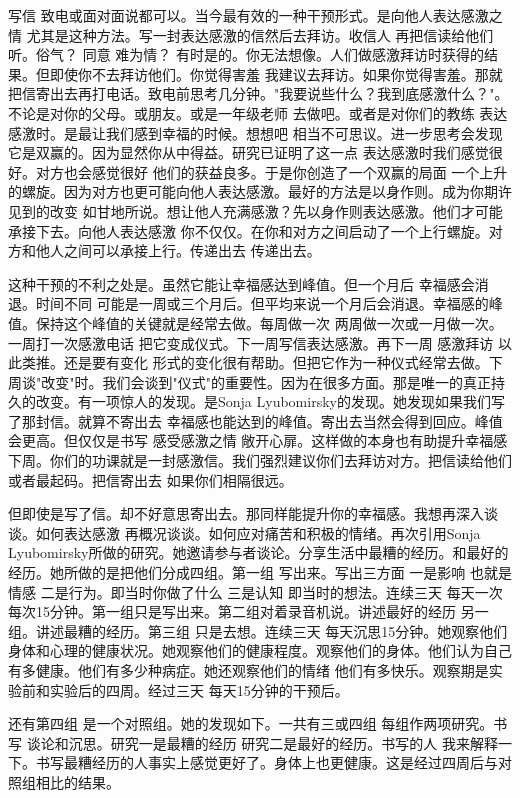 写信 致电或面对面说都可以。当今最有效的一种干预形式。是向他人表达感激之情 尤其是这种方法。写一封表达感激的信然后去拜访。收信人 再把信读给他们听。俗气？ 同意 难为情？ 有时是的。你无法想像。人们做感激拜访时获得的结果。但即使你不去拜访他们。你觉得害羞 我建议去拜访。如果你觉得害羞。那就把信寄出去再打电话。致电前思考几分钟。"我要说些什么？我到底感激什么？"。不论是对你的父母。或朋友。或是一年级老师 去做吧。或者是对你们的教练 表达感激时。是最让我们感到幸福的时候。想想吧 相当不可思议。进一步思考会发现它是双赢的。因为显然你从中得益。研究已证明了这一点 表达感激时我们感觉很好。对方也会感觉很好 他们的获益良多。于是你创造了一个双赢的局面 一个上升的螺旋。因为对方也更可能向他人表达感激。最好的方法是以身作则。成为你期许见到的改变 如甘地所说。想让他人充满感激？先以身作则表达感激。他们才可能承接下去。向他人表达感激 你不仅仅。在你和对方之间启动了一个上行螺旋。对方和他人之间可以承接上行。传递出去 传递出去。 

这种干预的不利之处是。虽然它能让幸福感达到峰值。但一个月后 幸福感会消退。时间不同 可能是一周或三个月后。但平均来说一个月后会消退。幸福感的峰值。保持这个峰值的关键就是经常去做。每周做一次 两周做一次或一月做一次。一周打一次感激电话 把它变成仪式。下一周写信表达感激。再下一周 感激拜访 以此类推。还是要有变化 形式的变化很有帮助。但把它作为一种仪式经常去做。下周谈"改变"时。我们会谈到"仪式"的重要性。因为在很多方面。那是唯一的真正持久的改变。有一项惊人的发现。是Sonja Lyubomirsky的发现。她发现如果我们写了那封信。就算不寄出去 幸福感也能达到的峰值。寄出去当然会得到回应。峰值会更高。但仅仅是书写 感受感激之情 敞开心扉。这样做的本身也有助提升幸福感 下周。你们的功课就是一封感激信。我们强烈建议你们去拜访对方。把信读给他们 或者最起码。把信寄出去 如果你们相隔很远。 

但即使是写了信。却不好意思寄出去。那同样能提升你的幸福感。我想再深入谈谈。如何表达感激 再概况谈谈。如何应对痛苦和积极的情绪。再次引用Sonja Lyubomirsky所做的研究。她邀请参与者谈论。分享生活中最糟的经历。和最好的经历。她所做的是把他们分成四组。第一组 写出来。写出三方面 一是影响 也就是情感 二是行为。即当时你做了什么 三是认知 即当时的想法。连续三天 每天一次 每次15分钟。第一组只是写出来。第二组对着录音机说。讲述最好的经历 另一组。讲述最糟的经历。第三组 只是去想。连续三天 每天沉思15分钟。她观察他们身体和心理的健康状况。她观察他们的健康程度。观察他们的身体。他们认为自己有多健康。他们有多少种病症。她还观察他们的情绪 他们有多快乐。观察期是实验前和实验后的四周。经过三天 每天15分钟的干预后。 

还有第四组 是一个对照组。她的发现如下。一共有三或四组 每组作两项研究。书写 谈论和沉思。研究一是最糟的经历 研究二是最好的经历。书写的人 我来解释一下。书写最糟经历的人事实上感觉更好了。身体上也更健康。这是经过四周后与对照组相比的结果。 

